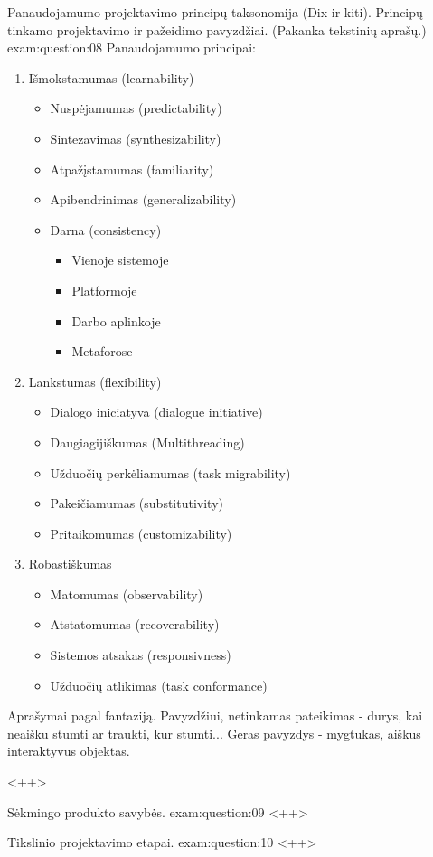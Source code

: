 \begin{question}{%
  Panaudojamumo projektavimo principų taksonomija (Dix ir kiti).
  Principų tinkamo projektavimo ir pažeidimo pavyzdžiai. (Pakanka
  tekstinių aprašų.)
  }{exam:question:08}
  Panaudojamumo principai:
  \begin{enumerate}
    \item Išmokstamumas (learnability)
      \begin{itemize}
        \item Nuspėjamumas (predictability)
        \item Sintezavimas (synthesizability)
        \item Atpažįstamumas (familiarity)
        \item Apibendrinimas (generalizability)
        \item Darna (consistency)
          \begin{itemize}
            \item Vienoje sistemoje
            \item Platformoje
            \item Darbo aplinkoje
            \item Metaforose
          \end{itemize}
      \end{itemize}
    \item Lankstumas (flexibility)
      \begin{itemize}
        \item Dialogo iniciatyva (dialogue initiative)
        \item Daugiagijiškumas (Multithreading)
        \item Užduočių perkėliamumas (task migrability)
        \item Pakeičiamumas (substitutivity)
        \item Pritaikomumas (customizability)
      \end{itemize}
    \item Robastiškumas
      \begin{itemize}
        \item Matomumas (observability)
        \item Atstatomumas (recoverability)
        \item Sistemos atsakas (responsivness)
        \item Užduočių atlikimas (task conformance)
      \end{itemize}
  \end{enumerate}
  
  Aprašymai pagal fantaziją. Pavyzdžiui, netinkamas pateikimas - durys, kai neaišku stumti ar traukti, kur stumti... Geras pavyzdys - mygtukas, aiškus interaktyvus objektas.
  
  <++>
\end{question}

\begin{question}{%
  Sėkmingo produkto savybės.
  }{exam:question:09}
  <++>
\end{question}

\begin{question}{%
  Tikslinio projektavimo etapai.
  }{exam:question:10}
  <++>
\end{question}
